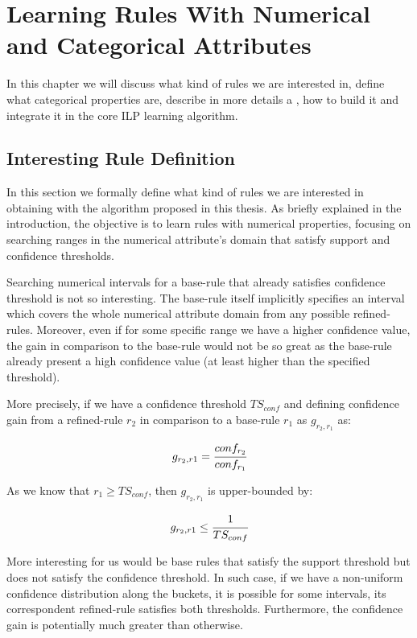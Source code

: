 \chapter{Learning Rules With Numerical and Categorical Attributes}
\label{cl:intro}

In this chapter we will discuss what kind of rules we are interested in, define what categorical properties are,
describe in more details a \graphname, how to build it and integrate it in the core ILP learning algorithm.

\section{Interesting Rule Definition}

In this section we formally define what kind of rules we are interested in obtaining with the algorithm proposed in
this thesis. As briefly explained in the introduction, the objective is to learn rules with numerical properties,
focusing on searching ranges in the numerical attribute's domain that satisfy support and confidence thresholds.

Searching numerical intervals for a base-rule that already satisfies confidence threshold is not so interesting. The
base-rule itself implicitly specifies an interval which covers the whole numerical attribute domain from any possible
refined-rules. Moreover, even if for some specific range we have a higher confidence value, the gain in comparison to
the base-rule would not be so great as the base-rule already present a high confidence value (at least higher than the
specified threshold).

More precisely, if we have a confidence threshold $TS_{conf}$ and defining confidence gain from a refined-rule
$r_2$ in comparison to a base-rule $r_1$ as $g_{r_2,r_1}$ as:

\begin{equation}
 g_{r_2,r1}=\cfrac{conf_{r_2}}{conf_{r_1}}
\end{equation}

As we know that $r_1 \geq TS_{conf}$, then $g_{r_2,r_1}$ is upper-bounded by:

\begin{equation}
 g_{r_2,r1} \leq \cfrac{1}{TS_{conf}}
\end{equation}

More interesting for us would be base rules that satisfy the support threshold but does not satisfy the confidence
threshold. In such case, if we have a non-uniform confidence distribution along the buckets, it is possible for some
intervals, its correspondent refined-rule satisfies both thresholds. Furthermore, the confidence gain is potentially
much greater than otherwise.


